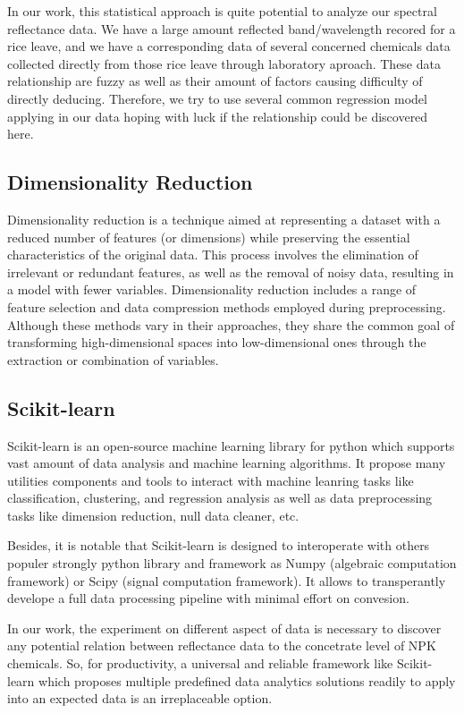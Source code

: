 In our work, this statistical approach is quite potential to analyze our spectral reflectance data.
We have a large amount reflected band/wavelength recored for a rice leave,
and we have a corresponding data of several concerned chemicals data collected directly
from those rice leave through laboratory aproach.
These data relationship are fuzzy
as well as their amount of factors causing difficulty of directly deducing.
Therefore, we try to use several common regression model applying in our data
hoping with luck if the relationship could be discovered here.

\subsection{Dimensionality Reduction}
Dimensionality reduction is a technique aimed at representing a dataset with a reduced number of features (or dimensions) while preserving the essential characteristics of the original data. This process involves the elimination of irrelevant or redundant features, as well as the removal of noisy data, resulting in a model with fewer variables. Dimensionality reduction includes a range of feature selection and data compression methods employed during preprocessing. Although these methods vary in their approaches, they share the common goal of transforming high-dimensional spaces into low-dimensional ones through the extraction or combination of variables.

\subsection{Scikit-learn}
Scikit-learn is an open-source machine learning library for python
which supports vast amount of data analysis and machine learning algorithms.
It propose many utilities components and tools to interact with machine leanring tasks
like classification, clustering, and regression analysis
as well as data preprocessing tasks like dimension reduction, null data cleaner, etc.

Besides, it is notable that Scikit-learn is designed to interoperate
with others populer strongly python library and framework
as Numpy (algebraic computation framework) or Scipy (signal computation framework).
It allows to transperantly develope a full data processing pipeline
with minimal effort on convesion.

In our work, the experiment on different aspect of data is necessary
to discover any potential relation between reflectance data to the concetrate level of NPK chemicals.
So, for productivity, a universal and reliable framework like Scikit-learn
which proposes multiple predefined data analytics solutions readily to apply into an expected data
is an irreplaceable option.

